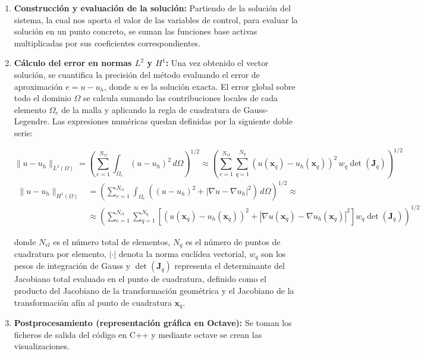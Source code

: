 \documentclass[11pt]{book}
\theoremstyle{plain} %
\theoremstyle{definition} %
\theoremstyle{definition} %
\begin{document}
\begin{enumerate}
    \item \textbf{Construcción y evaluación de la solución:} Partiendo de la solución del sistema, la cual nos aporta el valor de las variables de control, para evaluar la solución en un punto concreto, se suman las funciones base activas multiplicadas por sus coeficientes correspondientes.
    \item \textbf{Cálculo del error en normas $L^2$ y $H^1$:} Una vez obtenido el vector solución, se cuantifica la precisión del método evaluando el error de aproximación $e = u - u_h$,
            donde $u$ es la solución exacta. El error global sobre todo el dominio $\Omega$ se calcula sumando las contribuciones locales de cada elemento $\Omega_e$ de la malla
            y aplicando la regla de cuadratura de Gauss-Legendre. Las expresiones numéricas quedan definidas por la siguiente doble serie:
            
            {\setlength{\abovedisplayskip}{2pt}\setlength{\belowdisplayskip}{2pt}
            $$\|u - u_h\|_{L^2(\Omega)} = \left( \sum_{e=1}^{N_{el}} \int_{\Omega_e} (u - u_h)^2 \, d\Omega \right)^{1/2} \approx \left( \sum_{e=1}^{N_{el}} \sum_{q=1}^{N_q} (u(\mathbf{x}_q) - u_h(\mathbf{x}_q))^2 \, w_q \det(\mathbf{J}_q) \right)^{1/2}$$$$\begin{aligned}
            \|u - u_h\|_{H^1(\Omega)} &= \left( \sum_{e=1}^{N_{el}} \int_{\Omega_e} \left( (u - u_h)^2 + |\nabla u - \nabla u_h|^2 \right) \, d\Omega \right)^{1/2} \approx\\
            &\approx \left( \sum_{e=1}^{N_{el}} \sum_{q=1}^{N_q} \left[ (u(\mathbf{x}_q) - u_h(\mathbf{x}_q))^2 + |\nabla u(\mathbf{x}_q) - \nabla u_h(\mathbf{x}_q)|^2 \right] w_q \det(\mathbf{J}_q) \right)^{1/2}
            \end{aligned}$$}
            \noindent
            
            donde $N_{el}$ es el número total de elementos, $N_q$ es el número de puntos de cuadratura por elemento, $|\cdot|$ denota la norma euclídea vectorial, $w_q$ son los pesos de
            integración de Gauss y $\det(\mathbf{J}_q)$ representa el determinante del Jacobiano total evaluado en el punto de cuadratura, definido como el producto del Jacobiano de la
            transformación geométrica y el Jacobiano de la transformación afín al punto de cuadratura $\mathbf{x}_q$.
    
    \item \textbf{Postprocesamiento (representación gráfica en Octave):} Se toman los ficheros de salida del código en C++ y mediante octave se crean las visualizaciones.
\end{enumerate}
\end{document}
